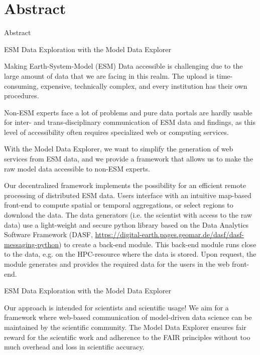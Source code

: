 
\section{Abstract} \label{sec:abstract}

\begin{frame}[t, allowframebreaks]{Abstract}
	\begin{block}{ESM Data Exploration with the Model Data Explorer}
		\begin{small}
			Making Earth-System-Model (ESM) Data accessible is challenging due
			to the large amount of data that we are facing in this realm. The
			upload is time-consuming, expensive, technically complex, and every
			institution has their own procedures.

            Non-ESM experts face a lot of problems and pure data portals are
			hardly usable for inter- and trans-disciplinary communication of
			ESM data and findings, as this level of accessibility often
			requires specialized web or computing services.

            With the Model Data Explorer, we want to simplify the generation of
			web services from ESM data, and we provide a framework that allows
			us to make the raw model data accessible to non-ESM experts.

            Our decentralized framework implements the possibility for an
			efficient remote processing of distributed ESM data. Users
			interface with an intuitive map-based front-end to compute spatial
			or temporal aggregations, or select regions to download the data.
			The data generators (i.e. the scientist with access to the raw
			data) use a light-weight and secure python library based on the
			Data Analytics Software Framework (DASF,
			\url{https://digital-earth.pages.geomar.de/dasf/dasf-messaging-python})
			to create a back-end module. This back-end module runs close to the
			data, e.g. on the HPC-resource where the data is stored. Upon
			request, the module generates and provides the required data for
			the users in the web front-end.

		\end{small}
	\end{block}

	\framebreak

	\begin{block}{ESM Data Exploration with the Model Data Explorer}
		\begin{small}
            Our approach is intended for scientists and scientific usage! We
			aim for a framework where web-based communication of model-driven
			data science can be maintained by the scientific community. The
			Model Data Explorer ensures fair reward for the scientific work and
			adherence to the FAIR principles without too much overhead and loss
			in scientific accuracy.


\end{small}
\end{block}
\end{frame}
